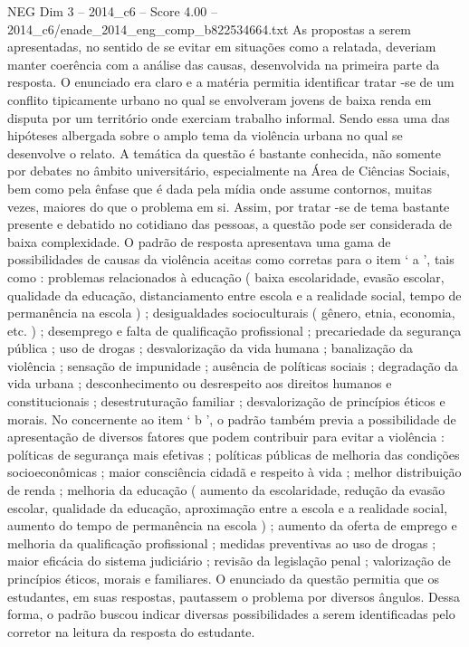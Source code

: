 \begin{textsample}{NEG Dim 3 – 2014\_c6 – Score 4.00 – 2014\_c6/enade\_2014\_eng\_comp\_b822534664.txt}
As propostas a serem apresentadas, no sentido de se evitar em situações como a relatada, deveriam manter coerência com a análise das causas, desenvolvida na primeira parte da resposta.
O enunciado era claro e a matéria permitia identificar tratar -se de um conflito tipicamente urbano no qual se envolveram jovens de baixa renda em disputa por um território onde exerciam trabalho informal.
Sendo essa uma das hipóteses albergada sobre o amplo tema da violência urbana no qual se desenvolve o relato.
A temática da questão é bastante conhecida, não somente por debates no âmbito universitário, especialmente na Área de Ciências Sociais, bem como pela ênfase que é dada pela mídia onde assume contornos, muitas vezes, maiores do que o problema em si.
Assim, por tratar -se de tema bastante presente e debatido no cotidiano das pessoas, a questão pode ser considerada de baixa complexidade.
O padrão de resposta apresentava uma gama de possibilidades de causas da violência aceitas como corretas para o item ‘ a ’, tais como : problemas relacionados à educação ( baixa escolaridade, evasão escolar, qualidade da educação, distanciamento entre escola e a realidade social, tempo de permanência na escola ) ; desigualdades socioculturais ( gênero, etnia, economia, etc. ) ; desemprego e falta de qualificação profissional ; precariedade da segurança pública ; uso de drogas ; desvalorização da vida humana ; banalização da violência ; sensação de impunidade ; ausência de políticas sociais ; degradação da vida urbana ; desconhecimento ou desrespeito aos direitos humanos e constitucionais ; desestruturação familiar ; desvalorização de princípios éticos e morais.
No concernente ao item ‘ b ’, o padrão também previa a possibilidade de apresentação de diversos fatores que podem contribuir para evitar a violência : políticas de segurança mais efetivas ; políticas públicas de melhoria das condições socioeconômicas ; maior consciência cidadã e respeito à vida ; melhor distribuição de renda ; melhoria da educação ( aumento da escolaridade, redução da evasão escolar, qualidade da educação, aproximação entre a escola e a realidade social, aumento do tempo de permanência na escola ) ; aumento da oferta de emprego e melhoria da qualificação profissional ; medidas preventivas ao uso de drogas ; maior eficácia do sistema judiciário ; revisão da legislação penal ; valorização de princípios éticos, morais e familiares.
O enunciado da questão permitia que os estudantes, em suas respostas, pautassem o problema por diversos ângulos.
Dessa forma, o padrão buscou indicar diversas possibilidades a serem identificadas pelo corretor na leitura da resposta do estudante.

\end{textsample}
